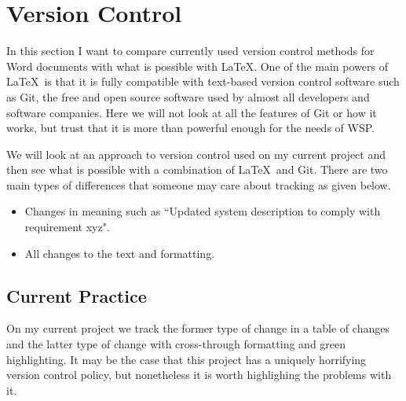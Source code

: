 \section{Version Control}
\label{sec:VersionControl}

In this section I want to compare currently used version control methods for Word documents with what is possible with \LaTeX. One of the main powers of \LaTeX\ is that it is fully compatible with text-based version control software such as Git, the free and open source software used by almost all developers and software companies. Here we will not look at all the features of Git or how it works, but trust that it is more than powerful enough for the needs of WSP.

We will look at an approach to version control used on my current project and then see what is possible with a combination of \LaTeX\ and Git. There are two main types of differences that someone may care about tracking as given below.

\begin{itemize}
	\item Changes in meaning such as ``Updated system description to comply with requirement xyz".
	\item All changes to the text and formatting.
\end{itemize}

\subsection{Current Practice}
\label{subsec:CurrentPractice}

On my current project we track the former type of change in a table of changes and the latter type of change with cross-through formatting and green highlighting. It may be the case that this project has a uniquely horrifying version control policy, but nonetheless it is worth highlighing the problems with it.

